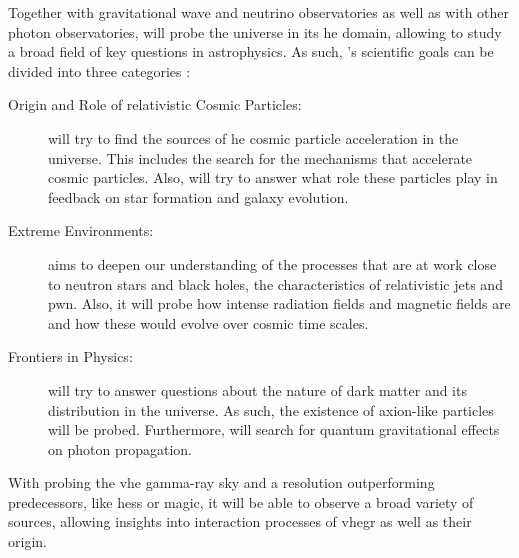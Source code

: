 Together with gravitational wave and neutrino observatories as well as with other photon observatories,
\cta{} will probe the universe in its \gls{he} domain, allowing to study a broad field of key questions
in astrophysics. As such, \cta's scientific goals can be divided into three categories \cite{cta_scientific_goals}:
\begin{description}
    \item [Origin and Role of relativistic Cosmic Particles:] \cta{} will try to find the sources of
    \gls{he} cosmic particle acceleration in the universe. This includes the search for the mechanisms
    that accelerate cosmic particles. Also, \cta{} will try to answer what role these particles play
    in feedback on star formation and galaxy evolution.
    \item [Extreme Environments:] \cta{} aims to deepen our understanding of the processes that
    are at work close to neutron stars and black holes, the characteristics of relativistic jets and
    \gls{pwn}. Also, it will probe how intense radiation fields and magnetic fields are and how these
    would evolve over cosmic time scales.
    \item [Frontiers in Physics:] \cta{} will try to answer questions about the nature of dark matter
    and its distribution in the universe. As such, the existence of axion-like particles will be
    probed. Furthermore, \cta{} will search for quantum gravitational effects on photon propagation.
\end{description}

With \cta{} probing the \gls{vhe} gamma-ray sky and a resolution outperforming predecessors, like
\gls{hess} or \gls{magic}, it will be able to observe a broad variety of sources, allowing insights
into interaction processes of \gls{vhegr} as well as their origin.